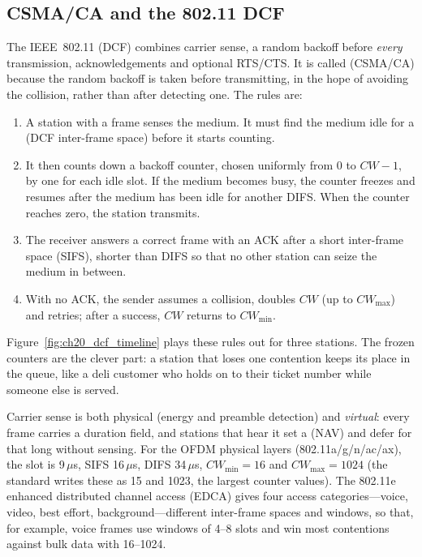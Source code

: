 \subsection{CSMA/CA and the 802.11 DCF}

The IEEE~802.11  (DCF) combines carrier sense, a random backoff
before \emph{every} transmission, acknowledgements and optional RTS/CTS. It is called  (CSMA/CA) because the random backoff is taken before transmitting, in the hope of
avoiding the collision, rather than after detecting one. The rules are:
\begin{enumerate}
\item A station with a frame senses the medium. It must find the medium idle for a  (DCF
inter-frame space) before it starts counting.
\item It then counts down a backoff counter, chosen uniformly from $0$ to $CW-1$, by one for each idle
slot. If the medium becomes busy, the counter freezes and resumes after the medium has been idle for
another DIFS. When the counter reaches zero, the station transmits.
\item The receiver answers a correct frame with an ACK after a short inter-frame space (SIFS), shorter than
DIFS so that no other station can seize the medium in between.
\item With no ACK, the sender assumes a collision, doubles $CW$ (up to $CW_{\max}$) and retries; after a
success, $CW$ returns to $CW_{\min}$.
\end{enumerate}
Figure~\ref{fig:ch20_dcf_timeline} plays these rules out for three stations. The frozen counters are the
clever part: a station that loses one contention keeps its place in the queue, like a deli customer who
holds on to their ticket number while someone else is served.


Carrier sense is both physical (energy and preamble detection) and \emph{virtual}: every frame carries a
duration field, and stations that hear it set a  (NAV) and defer for that
long without sensing. For the OFDM physical layers (802.11a/g/n/ac/ax), the slot is 9\,$\mu$s, SIFS
16\,$\mu$s, DIFS 34\,$\mu$s, $CW_{\min}=16$ and $CW_{\max}=1024$ (the standard writes these as 15 and
1023, the largest counter values). The 802.11e enhanced distributed channel access (EDCA) gives four access
categories---voice, video, best effort, background---different inter-frame spaces and windows, so that, for
example, voice frames use windows of 4--8 slots and win most contentions against bulk data with 16--1024.

